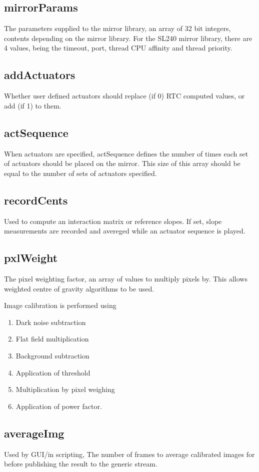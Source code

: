 \documentclass[a4,10pt]{article}
\begin{document}
\subsection{mirrorParams}
The parameters supplied to the mirror library, an array of 32 bit
integers, contents depending on the mirror library.  For the SL240
mirror library, there are 4 values, being the timeout, port, thread
CPU affinity and thread priority.

\subsection{addActuators}
Whether user defined actuators should replace (if 0) RTC computed
values, or add (if 1) to them.

\subsection{actSequence}
When actuators are specified, actSequence defines the number of times
each set of actuators should be placed on the mirror.  This size of
this array should be equal to the number of sets of actuators
specified.

\subsection{recordCents}
Used to compute an interaction matrix or reference slopes.  If set,
slope measurements are recorded and avereged while an actuator
sequence is played.

\subsection{pxlWeight}
The pixel weighting factor, an array of values to multiply pixels by.
This allows weighted centre of gravity algorithms to be used.

Image calibration is performed using
\begin{enumerate}
\item Dark noise subtraction
\item Flat field multiplication
\item Background subtraction
\item Application of threshold
\item Multiplication by pixel weighing
\item Application of power factor.
\end{enumerate}

\subsection{averageImg}
Used by GUI/in scripting, The number of frames to average calibrated
images for before publishing the result to the generic stream.
\end{document}
